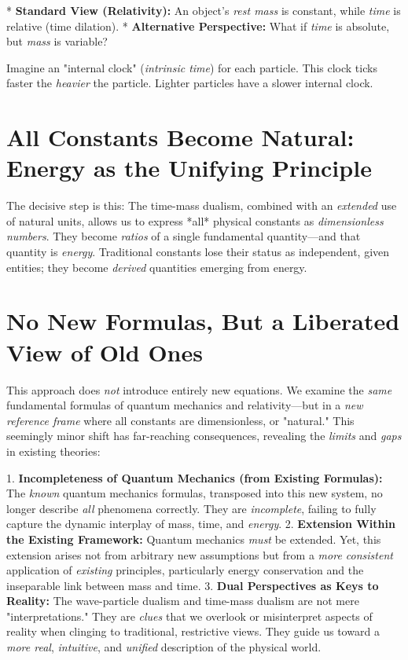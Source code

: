 \documentclass[a4paper,12pt]{article}
\begin{document}
	*   \textbf{Standard View (Relativity):} An object’s \emph{rest mass} is constant, while \emph{time} is relative (time dilation).
	*   \textbf{Alternative Perspective:} What if \emph{time} is absolute, but \emph{mass} is variable?
	
	Imagine an "internal clock" (\emph{intrinsic time}) for each particle. This clock ticks faster the \emph{heavier} the particle. Lighter particles have a slower internal clock.
	
	\section{All Constants Become Natural: Energy as the Unifying Principle}
	The decisive step is this: The time-mass dualism, combined with an \emph{extended} use of natural units, allows us to express *all* physical constants as \emph{dimensionless numbers}. They become \emph{ratios} of a single fundamental quantity—and that quantity is \emph{energy}. Traditional constants lose their status as independent, given entities; they become \emph{derived} quantities emerging from energy.
	
	\section{No New Formulas, But a Liberated View of Old Ones}
	This approach does \emph{not} introduce entirely new equations. We examine the \emph{same} fundamental formulas of quantum mechanics and relativity—but in a \emph{new reference frame} where all constants are dimensionless, or "natural." This seemingly minor shift has far-reaching consequences, revealing the \emph{limits} and \emph{gaps} in existing theories:
	
	1.  \textbf{Incompleteness of Quantum Mechanics (from Existing Formulas):} The \emph{known} quantum mechanics formulas, transposed into this new system, no longer describe \emph{all} phenomena correctly. They are \emph{incomplete}, failing to fully capture the dynamic interplay of mass, time, and \emph{energy}.
	2.  \textbf{Extension Within the Existing Framework:} Quantum mechanics \emph{must} be extended. Yet, this extension arises not from arbitrary new assumptions but from a \emph{more consistent} application of \emph{existing} principles, particularly energy conservation and the inseparable link between mass and time.
	3.  \textbf{Dual Perspectives as Keys to Reality:} The wave-particle dualism and time-mass dualism are not mere "interpretations." They are \emph{clues} that we overlook or misinterpret aspects of reality when clinging to traditional, restrictive views. They guide us toward a \emph{more real}, \emph{intuitive}, and \emph{unified} description of the physical world.
	
\end{document}
